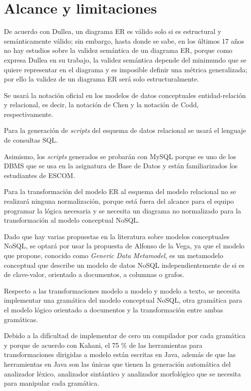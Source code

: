 \section{Alcance y limitaciones}\label{sec:alcance}
De acuerdo con Dullea\cite{dullea_analysis_2003}, un diagrama ER es válido solo si es estructural y semánticamente válido; sin embargo, hasta donde se sabe, en los últimos 17 años no hay estudios sobre la validez semántica de un diagrama ER, porque como expresa Dullea en su trabajo, la validez semántica depende del minimundo que se quiere representar en el diagrama y es imposible definir una métrica generalizada; por ello la validez de un diagrama ER será solo estructuralmente.


Se usará la notación oficial en los modelos de datos conceptuales entidad-relación y relacional, es decir, la notación de Chen y la notación de Codd, respectivamente.


Para la generación de \textit{scripts} del esquema de datos relacional se usará el lenguaje de consultas SQL.


Asimismo, los \textit{scripts} generados se probarán con MySQL porque es uno de los DBMS que se usa en la asignatura de Base de Datos y están familiarizados los estudiantes de ESCOM.


Para la transformación del modelo ER al esquema del modelo relacional no se realizará ninguna normalización, porque está fuera del alcance para el equipo programar la lógica necesaria y se necesita un diagrama no normalizado para la transformación al modelo conceptual NoSQL.


Dado que hay varias propuestas en la literatura sobre modelos conceptuales NoSQL, se optará por usar la propuesta de Alfonso de la Vega\cite{de_la_vega_mortadelo_2020}, ya que el modelo que propone, conocido como \textit{Generic Data Metamodel}, es un metamodelo conceptual que describe un modelo de datos NoSQL independientemente de si es de clave-valor, orientado a documentos, a columnas o grafos.


Respecto a las transformaciones modelo a modelo y modelo a texto, se necesita implementar una gramática del modelo conceptual NoSQL, otra gramática para el modelo lógico orientado a documentos y la transformación entre ambas gramáticas. 


Debido a la difícultad de implementar de cero un compilador por cada gramática y porque de acuerdo con Kahani\cite{kahani_survey_2019}, el 75 \% de las herramientas para transformaciones dirigidas a modelo están escritas en Java, además de que las herramientas en Java son las únicas que tienen la generación automática del analizador léxico, analizador sintántico y analizador morfológico que se necesita para manipular cada gramática.


